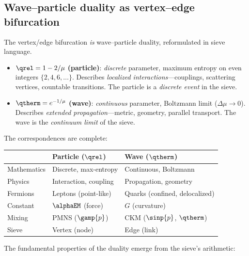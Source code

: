 \documentclass[12pt,a4paper]{article}
\begin{document}
\subsection{Wave--particle duality as vertex--edge bifurcation}
\label{sec:ch9_wave_particle}

The vertex/edge bifurcation \emph{is} wave--particle duality,
reformulated in sieve language.

\mDER
\begin{derbox}
\label{der:wave_particle}
\begin{itemize}[nosep]
\item $\qrel = 1 - 2/\mu$ \textbf{(particle)}: \emph{discrete}
  parameter, maximum entropy on even integers $\{2,4,6,\ldots\}$.
  Describes \emph{localized interactions}---couplings, scattering
  vertices, countable transitions. The particle is a \emph{discrete
  event} in the sieve.
\item $\qtherm = e^{-1/\mu}$ \textbf{(wave)}: \emph{continuous}
  parameter, Boltzmann limit ($\Delta\mu \to 0$). Describes
  \emph{extended propagation}---metric, geometry, parallel transport.
  The wave is the \emph{continuum limit} of the sieve.
\end{itemize}
\end{derbox}

The correspondences are complete:

\begin{center}
\small
\begin{tabular}{lll}
\toprule
 & \textbf{Particle} ($\qrel$) & \textbf{Wave} ($\qtherm$) \\
\midrule
Mathematics  & Discrete, max-entropy     & Continuous, Boltzmann \\
Physics      & Interaction, coupling      & Propagation, geometry \\
Fermions     & Leptons (point-like)       & Quarks (confined, delocalized) \\
Constant     & $\alphaEM$ (force)         & $G$ (curvature) \\
Mixing       & PMNS ($\gamp{p}$)          & CKM ($\sinp{p}$, $\qtherm$) \\
Sieve        & Vertex (node)              & Edge (link) \\
\bottomrule
\end{tabular}
\end{center}

The fundamental properties of the duality emerge from the sieve's
arithmetic:
\end{document}
